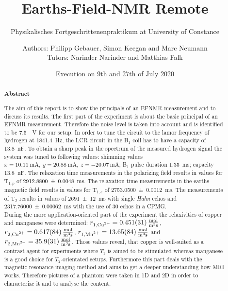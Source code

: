 \title{Earths-Field-NMR Remote}
\subtitle{Physikalisches Fortgeschrittenenpraktikum at University of Constance}
\author{Authors: Philipp Gebauer, Simon Keegan and Marc Neumann \\ \large{Tutors: Narinder Narinder and Matthias Falk}}
\date{Execution on 9th and 27th of July 2020}
\maketitle
\begin{abstract}
    \begin{center}
        \Large{\textsf{\textbf{Abstract}}}
    \end{center}
    \vspace{0.75 cm}
    \begin{singlespace}
    \noindent The aim of this report is to show the principals of an EFNMR measurement and to discuss its results.\newline
    The first part of the experiment is about the basic principal of an EFNMR measurement.
    Therefore the noise level is taken into account and is identified to be \SI{7.5}{\mu \volt} for our setup.
    In order to tune the circuit to the lamor frequency of hydrogen at \SI{1841.4}{\hertz}, the LCR circuit in the B$_1$ coil has to have a capacity of \SI{13.8}{\nano \farad}.
    To obtain a sharp peak in the spectrum of the measured hydrogen signal the system was tuned to following values: shimming values $x = \SI{10.11}{\milli \ampere}, \ y = \SI{20.88}{\milli \ampere}, \ z = \SI{-20.07}{\milli \ampere}$; B$_1$ pulse duration \SI{1.35}{\milli \second}; capacity \SI{13.8}{\nano \farad}.
    The relaxation time measurements in the polarizing field results in values for T$_{1,p}$ of \SI{2912.8800 \pm 0.0048}{\milli \second}.
    The relaxation time measurements in the earths magnetic field results in values for T$_{1,e}$ of \SI{2753.0500 \pm 0.0012}{\milli \second}.
    The measurements of T$_2$ results in values of \SI{2691 \pm 12}{\milli \second} with single \textit{Hahn} echos and \SI{2317.76000 \pm 0.00062}{\milli \second} with the use of 30 echos in a CPMG.\\
    During the more application-oriented part of the experiment the relaxivities of copper and manganese were determined: $r_{1,\text{\ce{Cu^2+}}} = \SI{0.451 \pm 0.031}{\frac{\mol}{\metre \cubed \second}}$, $r_{2,\text{\ce{Cu^2+}}} = \SI{0.617 \pm 0.084}{\frac{\mol}{\metre \cubed \second}}$, $r_{1,\text{\ce{Mn^2+}}} = \SI{13.65 \pm 0.84}{\frac{\mol}{\metre \cubed \second}}$ and $r_{2,\text{\ce{Mn^2+}}} = \SI{35.9 \pm 3.1}{\frac{\mol}{\metre \cubed \second}}$. Those values reveal, that copper is well-suited as a contrast agent for experiments where $T_1$ is aimed to be stimulated whereas manganese is a good choice for $T_2$-orientated setups.
    Furthermore this part deals with the magnetic resonance imaging method and aims to get a deeper understanding how MRI works. Therefore pictures of a phantom were taken in 1D and 2D in order to characterize it and to analyse the content.
    

\end{singlespace}
\end{abstract}
